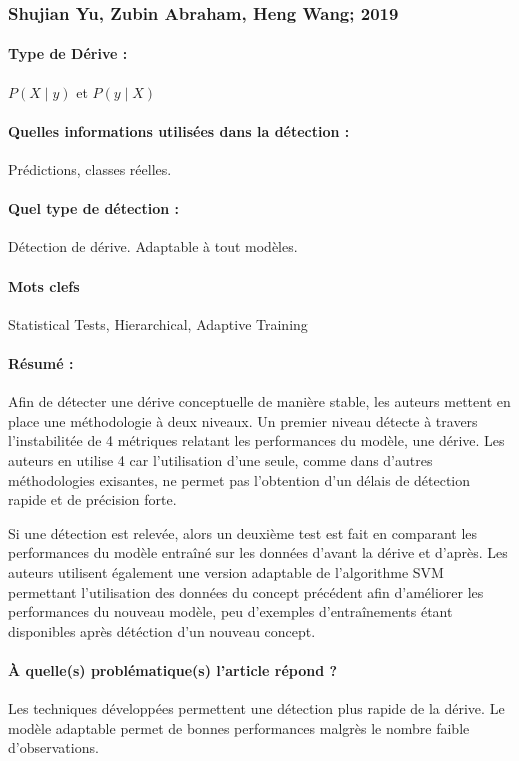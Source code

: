 \documentclass[11pt,a4paper]{report}
\begin{document}
\subsubsection{Shujian Yu, Zubin Abraham, Heng Wang; 2019}

\paragraph{Type de Dérive :} $P(X\mid y)$ et $P(y \mid X)$
\paragraph{Quelles informations utilisées dans la détection :} Prédictions, classes réelles.
\paragraph{Quel type de détection :} Détection de dérive. Adaptable à tout modèles.

\paragraph{Mots clefs} Statistical Tests, Hierarchical, Adaptive Training

\paragraph{Résumé :} Afin de détecter une dérive conceptuelle de manière stable, les auteurs mettent en place une méthodologie à deux niveaux. Un premier niveau détecte à travers l'instabilitée de 4 métriques relatant les performances du modèle, une dérive. Les auteurs en utilise 4 car l'utilisation d'une seule, comme dans d'autres méthodologies exisantes, ne permet pas l'obtention d'un délais de détection rapide et de précision forte.

Si une détection est relevée, alors un deuxième test est fait en comparant les performances du modèle entraîné sur les données d'avant la dérive et d'après. Les auteurs utilisent également une version adaptable de l'algorithme SVM permettant l'utilisation des données du concept précédent afin d'améliorer les performances du nouveau modèle, peu d'exemples d'entraînements étant disponibles après détéction d'un nouveau concept.

\paragraph{À quelle(s) problématique(s) l'article répond ?} Les techniques développées permettent une détection plus rapide de la dérive. Le modèle adaptable permet de bonnes performances malgrès le nombre faible d'observations.
\end{document}
